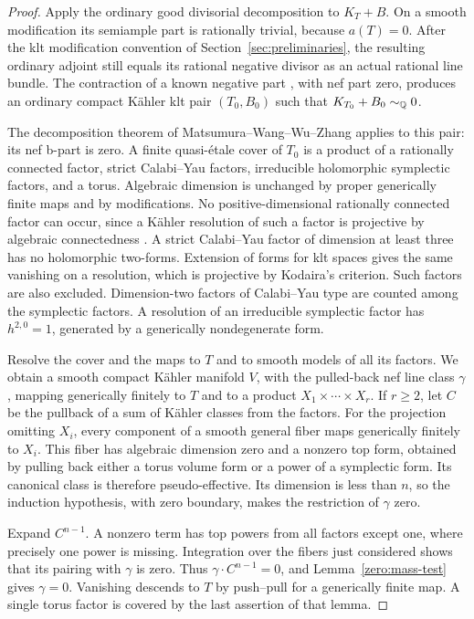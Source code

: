 \begin{proof}
Apply the ordinary good divisorial decomposition to \(K_T+B\).  On a
smooth modification its semiample part is rationally trivial, because
\(a(T)=0\).  After the klt modification convention of
Section~\ref{sec:preliminaries}, the resulting ordinary adjoint still
equals its rational negative divisor as an actual rational line bundle.
The contraction of a known negative part
\cite[Theorem~2.13 and Proposition~3.8]{K}, with nef part zero, produces
an ordinary compact Kähler klt pair \((T_0,B_0)\) such that
\(K_{T_0}+B_0\sim_{\mathbb Q}0\).

The decomposition theorem of Matsumura--Wang--Wu--Zhang
\cite[Corollary~1.4]{BBYv2} applies to this pair: its nef b-part is zero.
A finite quasi-étale cover of \(T_0\) is a product of a rationally
connected factor, strict Calabi--Yau factors, irreducible holomorphic
symplectic factors, and a torus.  Algebraic dimension is unchanged by
proper generically finite maps and by modifications.  No
positive-dimensional rationally connected factor can occur, since a
Kähler resolution of such a factor is projective by algebraic
connectedness \cite{Campana1981}.  A strict Calabi--Yau factor of
dimension at least three has no holomorphic two-forms.  Extension of
forms for klt spaces \cite{KebekusSchnell2021} gives the same vanishing on a resolution, which is
projective by Kodaira's criterion.  Such factors are also excluded.
Dimension-two factors of Calabi--Yau type are counted among the
symplectic factors.  A resolution of an irreducible symplectic factor
has \(h^{2,0}=1\), generated by a generically nondegenerate form.

Resolve the cover and the maps to \(T\) and to smooth models of all its
factors.  We obtain a smooth compact Kähler manifold \(V\), with the
pulled-back nef line class \(\gamma\), mapping generically finitely to
\(T\) and to a product \(X_1\times\cdots\times X_r\).  If \(r\ge2\),
let \(C\) be the pullback of a sum of Kähler classes from the factors.
For the projection omitting \(X_i\), every component of a smooth general
fiber maps generically finitely to \(X_i\).  This fiber has algebraic
dimension zero and a nonzero top form, obtained by pulling back either
a torus volume form or a power of a symplectic form.  Its canonical class
is therefore pseudo-effective.  Its dimension is less than \(n\), so
the induction hypothesis, with zero boundary, makes the restriction of
\(\gamma\) zero.

Expand \(C^{n-1}\).  A nonzero term has top powers from all factors
except one, where precisely one power is missing.  Integration over the
fibers just considered shows that its pairing with \(\gamma\) is zero.
Thus \(\gamma\cdot C^{n-1}=0\), and Lemma~\ref{zero:mass-test} gives
\(\gamma=0\).  Vanishing descends to \(T\) by push--pull for a
generically finite map.  A single torus factor is covered by the last
assertion of that lemma.


\end{proof}
